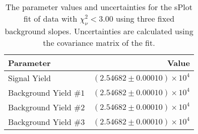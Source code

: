 
\begin{table}[ht]
    \begin{center}
        \begin{tabular}{lr}\toprule
            Parameter & Value \\\midrule
            Signal Yield & $(2.54682 \pm 0.00010) \times 10^{4}$ \\
            Background Yield $\#1$ & $(2.54682 \pm 0.00010) \times 10^{4}$ \\
            Background Yield $\#2$ & $(2.54682 \pm 0.00010) \times 10^{4}$ \\
            Background Yield $\#3$ & $(2.54682 \pm 0.00010) \times 10^{4}$ \\\bottomrule
        \end{tabular}
        \caption{The parameter values and uncertainties for the sPlot fit of data with $\chi^2_\nu < 3.00$ using three fixed background slopes. Uncertainties are calculated using the covariance matrix of the fit.}\label{tab:splot-fit-results-chisqdof-3.00-fixed-3}
    \end{center}
\end{table}
